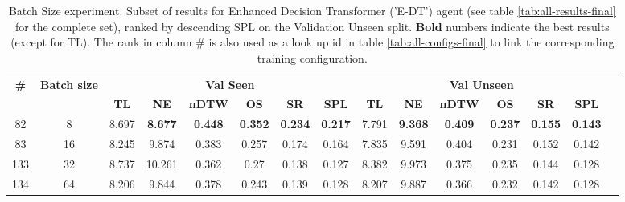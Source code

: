 \begin{table}
\centering
\caption{\label{tab:e_dt_batch_test}Batch Size experiment. Subset of results for Enhanced Decision Transformer ('E-DT') agent (see table \ref{tab:all-results-final} for the complete set), ranked by descending SPL on the Validation Unseen split. \textbf{Bold} numbers indicate the best results (except for TL). The rank in column \# is also used as a look up id in table \ref{tab:all-configs-final} to link the corresponding training configuration.}
\begin{tabular}{@{\hskip3pt}c@{\hskip3pt}c@{\hskip3pt}c@{\hskip3pt}c@{\hskip3pt}c@{\hskip3pt}c@{\hskip3pt}c@{\hskip3pt}c@{\hskip3pt}c@{\hskip3pt}c@{\hskip3pt}c@{\hskip3pt}c@{\hskip3pt}c@{\hskip3pt}c@{\hskip3pt}c}
\toprule
                                  \textbf{\#} & \textbf{Batch size} & \multicolumn{6}{c}{\textbf{Val Seen}} & \multicolumn{6}{c}{\textbf{Val Unseen}} \\
\cmidrule(l){3-8}\cmidrule(l){9-14}\textbf{~} &          \textbf{~} &       \textbf{TL} &     \textbf{NE} &   \textbf{nDTW} &     \textbf{OS} &     \textbf{SR} &    \textbf{SPL} &         \textbf{TL} &     \textbf{NE} &   \textbf{nDTW} &     \textbf{OS} &     \textbf{SR} &    \textbf{SPL} \\
\midrule
                                           82 &                   8 &             8.697 &  \textbf{8.677} &  \textbf{0.448} &  \textbf{0.352} &  \textbf{0.234} &  \textbf{0.217} &               7.791 &  \textbf{9.368} &  \textbf{0.409} &  \textbf{0.237} &  \textbf{0.155} &  \textbf{0.143} \\
                                           83 &                  16 &             8.245 &           9.874 &           0.383 &           0.257 &           0.174 &           0.164 &               7.835 &           9.591 &           0.404 &           0.231 &           0.152 &           0.142 \\
                                          133 &                  32 &             8.737 &          10.261 &           0.362 &            0.27 &           0.138 &           0.127 &               8.382 &           9.973 &           0.375 &           0.235 &           0.144 &           0.128 \\
                                          134 &                  64 &             8.206 &           9.844 &           0.378 &           0.243 &           0.139 &           0.128 &               8.207 &           9.887 &           0.366 &           0.232 &           0.142 &           0.128 \\
\bottomrule
\end{tabular}
\end{table}
